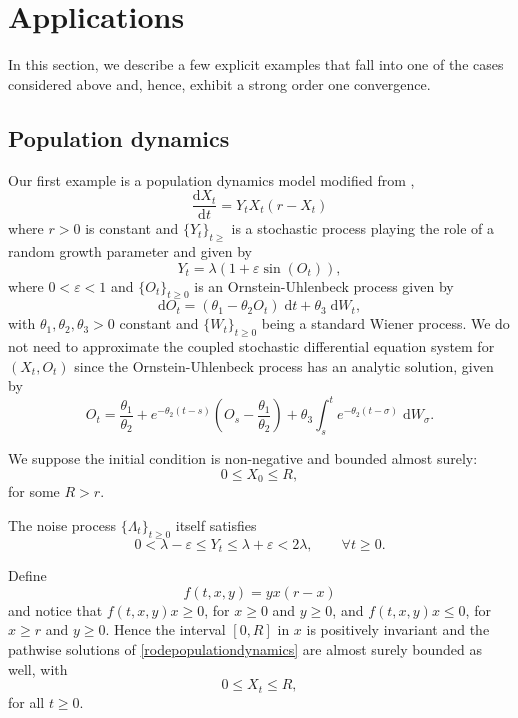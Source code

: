 \documentclass[reqno,12pt]{amsart}
\theoremstyle{plain}%
\theoremstyle{definition}
\begin{document}
\section{Applications}

In this section, we describe a few explicit examples that fall into one of the cases considered above and, hence, exhibit a strong order one convergence.

\subsection{Population dynamics}

Our first example is a population dynamics model modified from \cite[Section 15.2]{HanKloeden2017},
\begin{equation}
    \label{rodepopulationdynamics}
    \frac{\mathrm{d}X_t}{\mathrm{d}t} = Y_t X_t (r - X_t)
\end{equation}
where $r > 0$ is constant and $\{Y_t\}_{t \geq}$ is a stochastic process playing the role of a random growth parameter and given by
\[
    Y_t = \lambda (1 + \varepsilon \sin(O_t)),
\]
where $0 < \varepsilon < 1$ and $\{O_t\}_{t \geq 0}$ is an Ornstein-Uhlenbeck process given by
\[
    \mathrm{d}O_t = (\theta_1 - \theta_2 O_t)\;\mathrm{d}t + \theta_3\;\mathrm{d}W_t,
\]
with $\theta_1, \theta_2, \theta_3 > 0$ constant and $\{W_t\}_{t\geq 0}$ being a standard Wiener process. We do not need to approximate the coupled stochastic differential equation system for $(X_t, O_t)$ since the Ornstein-Uhlenbeck process has an analytic solution, given by
\[
    O_t = \frac{\theta_1}{\theta_2} + e^{-\theta_2 (t - s)}\left(O_s - \frac{\theta_1}{\theta_2}\right) + \theta_3\int_s^t e^{-\theta_2 (t - \sigma)}\;\mathrm{d}W_\sigma.
\]

We suppose the initial condition is non-negative and bounded almost surely:
\[
    0 \leq X_0 \leq R,
\]
for some $R > r$.

The noise process $\{\Lambda_t\}_{t \geq 0}$ itself satisfies
\[
    0 < \lambda - \varepsilon \leq Y_t \leq \lambda + \varepsilon < 2\lambda, \qquad \forall t \geq 0.
\]

Define 
\[
    f(t, x, y) = yx(r - x)
\]
and notice that $f(t, x, y)x \geq 0$, for $x \geq 0$ and $y \geq 0$, and $f(t, x, y)x \leq 0$, for $x \geq r$ and $y \geq 0$. Hence the interval $[0, R]$ in $x$ is positively invariant and the pathwise solutions of \eqref{rodepopulationdynamics} are almost surely bounded as well, with
\[
    0 \leq X_t \leq R,
\]
for all $t \geq 0$.
\end{document}
